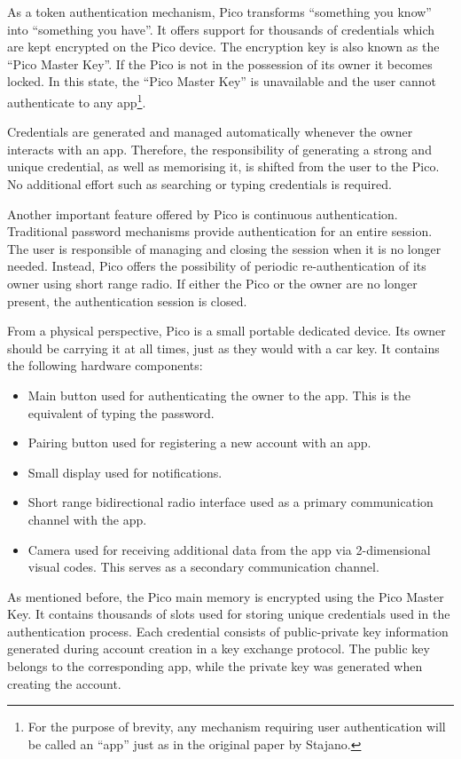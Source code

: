 As a token authentication mechanism, Pico transforms ``something you know'' into ``something you have''. It offers support for thousands of credentials which are kept encrypted on the Pico device. The encryption key is also known as the ``Pico Master Key''. If the Pico is not in the possession of its owner it becomes locked. In this state, the ``Pico Master Key'' is unavailable and the user cannot authenticate to any app\footnote{For the purpose of brevity, any mechanism requiring user authentication will be called an ``app'' just as in the original paper by Stajano.}.

Credentials are generated and managed automatically whenever the owner interacts with an app. Therefore, the responsibility of generating a strong and unique credential, as well as memorising it, is shifted from the user to the Pico. No additional effort such as searching or typing credentials is required.

Another important feature offered by Pico is continuous authentication. Traditional password mechanisms provide authentication for an entire session. The user is responsible of managing and closing the session when it is no longer needed. Instead, Pico offers the possibility of periodic re-authentication of its owner using short range radio. If either the Pico or the owner are no longer present, the authentication session is closed. 

From a physical perspective, Pico is a small portable dedicated device. Its owner should be carrying it at all times, just as they would with a car key. It contains the following hardware components:
\begin{itemize}
	\item Main button used for authenticating the owner to the app. This is the equivalent of typing the password.
	\item Pairing button used for registering a new account with an app.
	\item Small display used for notifications.
	\item Short range bidirectional radio interface used as a primary communication channel with the app.
	\item Camera used for receiving additional data from the app via 2-dimensional visual codes. This serves as a secondary communication channel.
\end{itemize}

As mentioned before, the Pico main memory is encrypted using the Pico Master Key. It contains thousands of slots used for storing unique credentials used in the authentication process. Each credential consists of public-private key information generated during account creation in a key exchange protocol. The public key belongs to the corresponding app, while the private key was generated when creating the account. 


